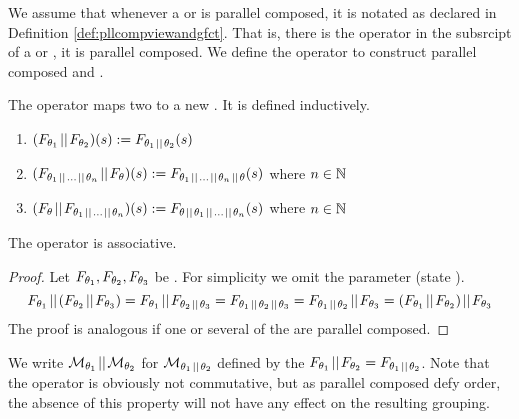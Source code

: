 \documentclass[preview]{standalone}
\begin{document}
We assume that whenever a \viewN or \grpfctN is parallel composed, it is notated as declared in Definition \ref{def:pllcompviewandgfct}. That is, \iffN there is the operator \pll in the subsrcipt of a \viewN or \grpfctN, it is parallel composed. We define the operator \pll to construct parallel composed \grpfctsN and \viewsN. 

\begin{definition}
	The operator \pll maps two \grpfctsN to a new \grpfctN. It is defined inductively.
	\begin{enumerate}
		\item $(\grpfct[\viewppty_1] \pll \grpfct[\viewppty_2])(\state) := \grpfct[{\viewppty_1 \pll \viewppty_2}](\state)$
		\item $(\grpfct[{\viewppty_1 \pll \dots \pll \viewppty_n}] \pll \grpfct)(\state) := \grpfct[{\viewppty_1 \pll \dots \pll \viewppty_n \pll \viewppty}](\state)$ \quad where $n \in \natnums$
		\item $(\grpfct \pll \grpfct[{\viewppty_1 \pll \dots \pll \viewppty_n}])(\state) := \grpfct[{\viewppty \pll \viewppty_1 \pll \dots \pll \viewppty_n}](\state)$ \quad where $n \in \natnums$
	\end{enumerate}
	
\end{definition}

\begin{proposition}
	The operator \pll is associative.
\end{proposition}

\begin{proof}
	Let	$\grpfct[\viewppty_1], \grpfct[\viewppty_2], \grpfct[\viewppty_3]$ be \grpfctsN. For simplicity we omit the parameter (state \state).
	\[
		\grpfct[\viewppty_1] \pll (\grpfct[\viewppty_2] \pll \grpfct[\viewppty_3]) = \grpfct[\viewppty_1] \pll \grpfct[{\viewppty_2 \pll \viewppty_3}] = \grpfct[{\viewppty_1 \pll \viewppty_2 \pll \viewppty_3}] = \grpfct[{\viewppty_1 \pll \viewppty_2}] \pll \grpfct[\viewppty_3] = (\grpfct[\viewppty_1] \pll \grpfct[\viewppty_2]) \pll \grpfct[\viewppty_3]
	\]
	The proof is analogous if one or several of the \grpfctsN are parallel composed.
\end{proof}

We write $\view[\viewppty_1] \pll \view[\viewppty_2]$ for $\view[\viewppty_1 \pll \viewppty_2]$ defined by the \grpfctN $\grpfct[\viewppty_1] \pll \grpfct[\viewppty_2] = \grpfct[\viewppty_1 \pll \viewppty_2]$.
Note that the operator \pll is obviously not commutative, but as parallel composed \grpfctsN defy order, the absence of this property will not have any effect on the resulting grouping.
\end{document}

